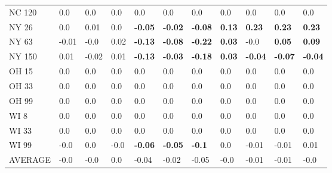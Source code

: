\begin{tabular}{lllllllllll}
NC 120  &     0.0 &             0.0 &     0.0 &             0.0 &             0.0 &             0.0 &             0.0 &             0.0 &             0.0 &             0.0 \\
NY 26   &     0.0 &            0.01 &     0.0 &  \textbf{-0.05} &  \textbf{-0.02} &  \textbf{-0.08} &   \textbf{0.13} &   \textbf{0.23} &   \textbf{0.23} &   \textbf{0.23} \\
NY 63   &   -0.01 &            -0.0 &    0.02 &  \textbf{-0.13} &  \textbf{-0.08} &  \textbf{-0.22} &   \textbf{0.03} &            -0.0 &   \textbf{0.05} &   \textbf{0.09} \\
NY 150  &    0.01 &           -0.02 &    0.01 &  \textbf{-0.13} &  \textbf{-0.03} &  \textbf{-0.18} &   \textbf{0.03} &  \textbf{-0.04} &  \textbf{-0.07} &  \textbf{-0.04} \\
OH 15   &     0.0 &             0.0 &     0.0 &             0.0 &             0.0 &             0.0 &             0.0 &             0.0 &             0.0 &             0.0 \\
OH 33   &     0.0 &             0.0 &     0.0 &             0.0 &             0.0 &             0.0 &             0.0 &             0.0 &             0.0 &             0.0 \\
OH 99   &     0.0 &             0.0 &     0.0 &             0.0 &             0.0 &             0.0 &             0.0 &             0.0 &             0.0 &             0.0 \\
WI 8    &     0.0 &             0.0 &     0.0 &             0.0 &             0.0 &             0.0 &             0.0 &             0.0 &             0.0 &             0.0 \\
WI 33   &     0.0 &             0.0 &     0.0 &             0.0 &             0.0 &             0.0 &             0.0 &             0.0 &             0.0 &             0.0 \\
WI 99   &    -0.0 &             0.0 &    -0.0 &  \textbf{-0.06} &  \textbf{-0.05} &   \textbf{-0.1} &             0.0 &           -0.01 &           -0.01 &            0.01 \\
AVERAGE &    -0.0 &            -0.0 &     0.0 &           -0.04 &           -0.02 &           -0.05 &            -0.0 &           -0.01 &           -0.01 &            -0.0 \\
\bottomrule
\end{tabular}
